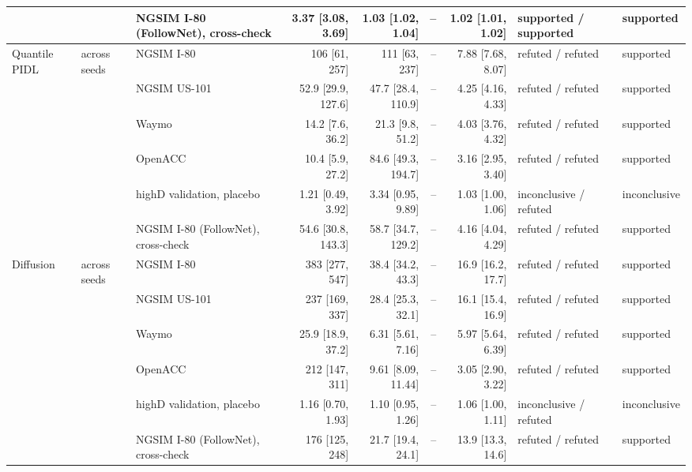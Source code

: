 \begin{longtable}{lllrrrrll}
 &  & NGSIM I-80 (FollowNet), cross-check & 3.37 [3.08, 3.69] & 1.03 [1.02, 1.04] & -- & 1.02 [1.01, 1.02] & supported / supported & supported \\
\midrule
Quantile PIDL & across seeds & NGSIM I-80 & 106 [61, 257] & 111 [63, 237] & -- & 7.88 [7.68, 8.07] & refuted / refuted & supported \\
 &  & NGSIM US-101 & 52.9 [29.9, 127.6] & 47.7 [28.4, 110.9] & -- & 4.25 [4.16, 4.33] & refuted / refuted & supported \\
 &  & Waymo & 14.2 [7.6, 36.2] & 21.3 [9.8, 51.2] & -- & 4.03 [3.76, 4.32] & refuted / refuted & supported \\
 &  & OpenACC & 10.4 [5.9, 27.2] & 84.6 [49.3, 194.7] & -- & 3.16 [2.95, 3.40] & refuted / refuted & supported \\
 &  & highD validation, placebo & 1.21 [0.49, 3.92] & 3.34 [0.95, 9.89] & -- & 1.03 [1.00, 1.06] & inconclusive / refuted & inconclusive \\
 &  & NGSIM I-80 (FollowNet), cross-check & 54.6 [30.8, 143.3] & 58.7 [34.7, 129.2] & -- & 4.16 [4.04, 4.29] & refuted / refuted & supported \\
\midrule
Diffusion & across seeds & NGSIM I-80 & 383 [277, 547] & 38.4 [34.2, 43.3] & -- & 16.9 [16.2, 17.7] & refuted / refuted & supported \\
 &  & NGSIM US-101 & 237 [169, 337] & 28.4 [25.3, 32.1] & -- & 16.1 [15.4, 16.9] & refuted / refuted & supported \\
 &  & Waymo & 25.9 [18.9, 37.2] & 6.31 [5.61, 7.16] & -- & 5.97 [5.64, 6.39] & refuted / refuted & supported \\
 &  & OpenACC & 212 [147, 311] & 9.61 [8.09, 11.44] & -- & 3.05 [2.90, 3.22] & refuted / refuted & supported \\
 &  & highD validation, placebo & 1.16 [0.70, 1.93] & 1.10 [0.95, 1.26] & -- & 1.06 [1.00, 1.11] & inconclusive / refuted & inconclusive \\
 &  & NGSIM I-80 (FollowNet), cross-check & 176 [125, 248] & 21.7 [19.4, 24.1] & -- & 13.9 [13.3, 14.6] & refuted / refuted & supported \\
\end{longtable}
\endgroup
